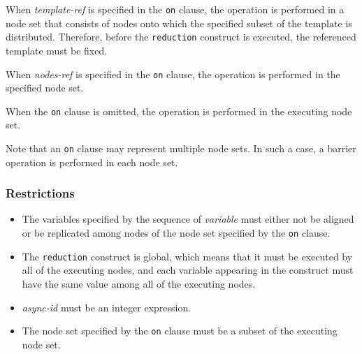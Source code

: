 When {\it template-ref} is specified in the {\tt on} clause, the operation
is performed in a node set that consists of nodes onto which the
specified subset of the template is distributed.
Therefore, before the {\tt reduction} construct is executed, the
referenced template must be fixed.
%
%

When {\it nodes-ref} is specified in the {\tt on} clause, the operation
is performed in the specified node set.

When the {\tt on} clause is omitted, the operation is performed in the
executing node set.

Note that an {\tt on} clause may represent multiple node sets. In such a
case, a barrier operation is performed in each node set.

\subsubsection*{Restrictions}

\begin{itemize}
 \item The variables specified by the sequence of {\it variable} must
       either not be aligned or be replicated among nodes of the node
       set specified by the {\tt on} clause.
 \item The {\tt reduction} construct is global, which means that it must
       be executed by all of the executing nodes, and each variable
       appearing in the construct must have the same value among all of
       the executing nodes.
 \item {\it async-id} must be an integer expression.
 \item The node set specified by the {\tt on} clause must be a subset of the
       executing node set.
\end{itemize}

